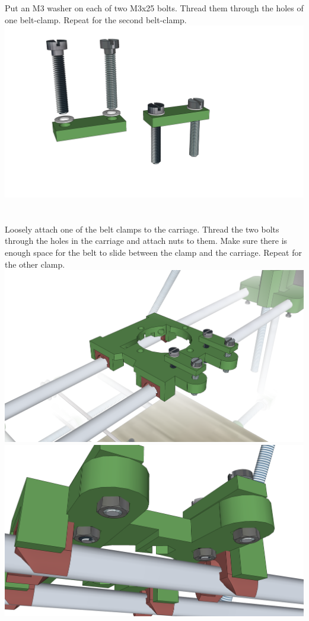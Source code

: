 \documentclass[twoside,openany,a4paper,titlepage]{memoir}
\begin{document}
	\section{}
	Put an M3 washer on each of two M3x25 bolts. Thread them through the holes of one belt-clamp.
	Repeat for the second belt-clamp.\\
	\includegraphics[width=1\linewidth]{graphics/ch9_12.png}
	
	\section{}
	Loosely attach one of the belt clamps to the carriage. Thread the two bolts through the holes in the
	carriage and attach nuts to them. Make sure there is enough space for the belt to slide between the
	clamp and the carriage. Repeat for the other clamp.\\
	\includegraphics[width=1\linewidth]{graphics/ch9_13_1.png}
	\includegraphics[width=1\linewidth]{graphics/ch9_13_2.png}
	
\end{document}
